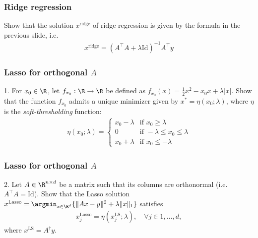 \documentclass{beamer}
\begin{document}
\begin{frame}[t] 
\frametitle{Ridge regression}
\vspace{-10pt}
Show that the solution $x^{\text{ridge}}$ of ridge regression is given by the formula in the previous slide, i.e.
\begin{align*}
x^{\text{ridge}} = (A^{\top} A + \lambda \text{Id} )^{-1} A^{\top} y
\end{align*}
\pause
\end{frame}

\begin{frame}[t] 
\frametitle{Lasso for orthogonal $A$}
\vspace{-10pt}
1. For $x_0 \in \R$, let $f_{x_0} : \R \rightarrow \R$ be defined as $f_{x_0}(x) = \frac{1}{2}x^2 - x_0 x + \lambda |x|$. Show that the function $f_{x_0}$ admits a unique minimizer given by $x^{*} = \eta(x_0; \lambda)$, where $\eta$ is the \textit{soft-thresholding} function:
\begin{align*}
\eta(x_0; \lambda) = 
\begin{cases}
x_0 - \lambda & \text{if } x_0 \geq \lambda \\
0 & \text{if } -\lambda \leq x_0 \leq \lambda \\
x_0 + \lambda & \text{if } x_0 \leq  - \lambda
\end{cases}
\end{align*}
\pause
\end{frame}

\begin{frame}[t] 
\frametitle{Lasso for orthogonal $A$}
\vspace{-10pt}
2. Let $A \in \R^{n \times d}$ be a matrix such that its columns are orthonormal (i.e. $A^\top A = \text{Id}$). Show that the Lasso solution $x^{\text{Lasso}} = \argmin_{x \in \R^d} \{  \|Ax - y\|^2 + \lambda \|x\|_1 \}$ satisfies
\begin{align*}
x_j^{\text{Lasso}} = \eta(x_j^{\text{LS}}; \lambda), \quad \forall j \in 1, \dots, d,
\end{align*}
where $x^{\text{LS}} = A^{\dagger} y$.
\pause
\end{frame}
\end{document}
